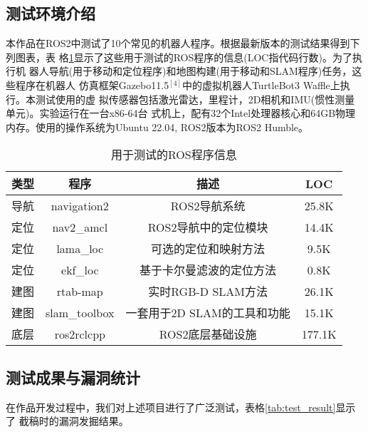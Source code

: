 \subsection{测试环境介绍}
本作品在ROS2中测试了10个常见的机器人程序。根据最新版本的测试结果得到下列图表，表
格\ref{tb:ros_test}显示了这些用于测试的ROS程序的信息(LOC指代码行数)。为了执行机
器人导航(用于移动和定位程序)和地图构建(用于移动和SLAM程序)任务，这些程序在机器人
仿真框架Gazebo11.5$^{[4]}$中的虚拟机器人TurtleBot3 Waffle上执行。本测试使用的虚
拟传感器包括激光雷达，里程计，2D相机和IMU(惯性测量单元)。实验运行在一台x86-64台
式机上，配有32个Intel处理器核心和64GB物理内存。使用的操作系统为Ubuntu 22.04,
ROS2版本为ROS2 Humble。
\begin{table}[H]
	\small
	\caption{用于测试的ROS程序信息}
	\label{tb:ros_test}
	\centering
	\begin{tabular}{cccc}
		\hline  
		\textbf{类型} & \textbf{程序} & \textbf{描述} & \textbf{LOC} \\ 
		\hline  
    导航 & navigation2 & ROS2导航系统 & 25.8K \\
		定位 & nav2\_amcl & ROS2导航中的定位模块 & 14.4K \\
		定位 & lama\_loc & 可选的定位和映射方法 & 9.5K \\
		定位 & ekf\_loc & 基于卡尔曼滤波的定位方法 & 0.8K \\
		建图 & rtab-map & 实时RGB-D SLAM方法 & 26.1K \\
		建图 & slam\_toolbox & 一套用于2D SLAM的工具和功能 & 15.1K \\
    底层 & ros2rclcpp & ROS2底层基础设施 & 177.1K \\
		\hline
	\end{tabular} 
\end{table}

\subsection{测试成果与漏洞统计}
在作品开发过程中，我们对上述项目进行了广泛测试，表格\ref{tab:test_result}显示了
截稿时的漏洞发掘结果。

